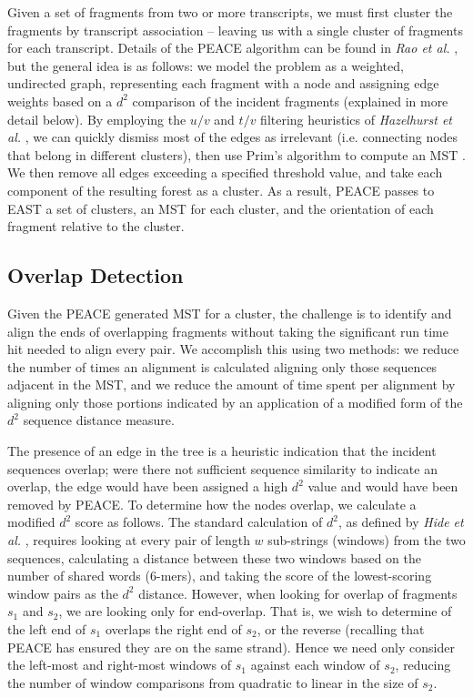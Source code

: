 \documentclass[10pt]{bmc_article}
\newcommand{\peace} {{\small PEACE}}
\newcommand{\east} {{\small EAST}}
\newenvironment{bmcformat}{\begin{raggedright}\baselineskip20pt\sloppy\setboolean{publ}{false}}{\end{raggedright}\baselineskip20pt\sloppy}
\begin{document}
\begin{bmcformat}
Given a set of fragments from two or more transcripts, we must first
cluster the fragments by transcript association -- leaving us with a
single cluster of fragments for each transcript.  Details of the
\peace\/ algorithm can be found in {\it Rao et al.} \cite{Rao10}, but
the general idea is as follows: we model the problem as a weighted,
undirected graph, representing each fragment with a node and assigning
edge weights based on a $d^2$ comparison of the incident fragments
(explained in more detail below).  By employing the $u/v$ and $t/v$
filtering heuristics of {\it Hazelhurst et al.} \cite{Hazelhurst08},
we can quickly dismiss most of the edges as irrelevant
(i.e. connecting nodes that belong in different clusters), then use
Prim's algorithm to compute an MST \cite{Prim57}.  We then remove all
edges exceeding a specified threshold value, and take each component
of the resulting forest as a cluster.  As a result, \peace\/ passes to
\east\/ a set of clusters, an MST for each cluster, and the
orientation of each fragment relative to the cluster.

\subsection*{Overlap Detection}

Given the \peace\/ generated MST for a cluster, the challenge is to
identify and align the ends of overlapping fragments without taking
the significant run time hit needed to align every pair.  We
accomplish this using two methods: we reduce the number of times an
alignment is calculated aligning only those sequences adjacent in the
MST, and we reduce the amount of  time spent per alignment by aligning
only those portions indicated by an application of a modified form of
the $d^2$ sequence distance measure.

\vspace{3mm}

The presence of an edge in the tree is a heuristic indication that the
incident sequences overlap; were there not sufficient sequence
similarity to indicate an overlap, the edge would have been assigned a
high $d^2$ value and would have been removed by \peace\/.  To
determine how the nodes overlap, we calculate a modified $d^2$ score
as follows.  The standard calculation of $d^2$, as defined by {\it Hide
  et al.} \cite{Hide94}, requires looking at every pair of length $w$
sub-strings (windows) from the two sequences, calculating a distance
between these two windows based on the number of shared words
(6-mers), and taking the score of the lowest-scoring window pairs as
the $d^2$ distance.  However, when looking for overlap of fragments
$s_1$ and $s_2$, we are looking only for end-overlap.  That is, we
wish to determine of the left end of $s_1$ overlaps the right end of
$s_2$, or the reverse (recalling that \peace\/ has ensured they are on the same
strand).  Hence we need only consider the left-most and right-most
windows of $s_1$ against each window of $s_2$, reducing the number of
window comparisons from quadratic to linear in the size of $s_2$.


\end{bmcformat}
\end{document}
